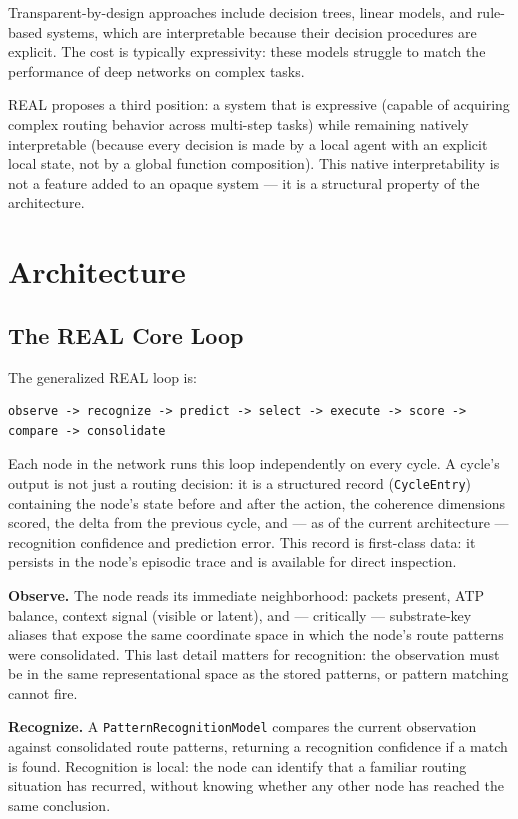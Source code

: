 \documentclass[letterpaper]{article}
\begin{document}
Transparent-by-design approaches include decision trees, linear models, and rule-based systems, which are interpretable because their decision procedures are explicit. The cost is typically expressivity: these models struggle to match the performance of deep networks on complex tasks.

REAL proposes a third position: a system that is expressive (capable of acquiring complex routing behavior across multi-step tasks) while remaining natively interpretable (because every decision is made by a local agent with an explicit local state, not by a global function composition). This native interpretability is not a feature added to an opaque system — it is a structural property of the architecture.

\section{Architecture}

\subsection{The REAL Core Loop}

The generalized REAL loop is:
\begin{verbatim}
observe -> recognize -> predict -> select -> execute -> score -> compare -> consolidate
\end{verbatim}

Each node in the network runs this loop independently on every cycle. A cycle's output is not just a routing decision: it is a structured record (\texttt{CycleEntry}) containing the node's state before and after the action, the coherence dimensions scored, the delta from the previous cycle, and — as of the current architecture — recognition confidence and prediction error. This record is first-class data: it persists in the node's episodic trace and is available for direct inspection.

\textbf{Observe.} The node reads its immediate neighborhood: packets present, ATP balance, context signal (visible or latent), and — critically — substrate-key aliases that expose the same coordinate space in which the node's route patterns were consolidated. This last detail matters for recognition: the observation must be in the same representational space as the stored patterns, or pattern matching cannot fire.

\textbf{Recognize.} A \texttt{PatternRecognitionModel} compares the current observation against consolidated route patterns, returning a recognition confidence if a match is found. Recognition is local: the node can identify that a familiar routing situation has recurred, without knowing whether any other node has reached the same conclusion.
\end{document}
